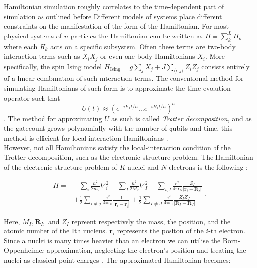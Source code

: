 Hamiltonian simulation roughly correlates to the time-dependent part of simulation as outlined before 
Different models of systems place different constraints on the manifestation of the form of the Hamiltonian. For most physical systems of $n$ particles the Hamiltonian can be written as
$H = \sum_k^L H_k$ where each $H_k$ acts on a specific subsystem. Often these terms are two-body interaction terms such as $X_i X_j$ or even one-body Hamiltonians $X_i$. More specifically, the spin Ising model $
H_{\mathrm{Ising}}=g \sum_{j} X_{j}+J \sum_{\langle i, j\rangle} Z_{i} Z_j
$ consists entirely of a linear combination of such interaction terms. The conventional method for simulating Hamiltonians of such form is to approximate the time-evolution operator such that  $$U(t) \approx\left(e^{-i H_{1} t / n} \ldots e^{-i H_{\ell} t / n}\right)^{n}$$. The method for approximating $U$ as such is called \textit{Trotter decomposition}, and as the gatecount grows polynomially with the number of qubits and time, this method is efficient for
local-interaction Hamiltonians \cite{cao}. \\

However, not all Hamiltonians satisfy the local-interaction condition of the Trotter decomposition, such as the electronic structure problem. The Hamiltonian of the electronic structure problem of $K$ nuclei and $N$ electrons is the following \cite{McArdle}:

$$
\begin{aligned}
H=&-\sum_{i} \frac{\hbar^{2}}{2 m_{e}} \nabla_{i}^{2}-\sum_{I} \frac{\hbar^{2}}{2 M_{I}} \nabla_{I}^{2}-\sum_{i, I} \frac{e^{2}}{4 \pi \epsilon_{0}} \frac{Z_{I}}{\left|\mathbf{r}_{i}-\mathbf{R}_{I}\right|} \\
&+\frac{1}{2} \sum_{i \neq j} \frac{e^{2}}{4 \pi \epsilon_{0}} \frac{1}{\left|\mathbf{r}_{i}-\mathbf{r}_{j}\right|}+\frac{1}{2} \sum_{I \neq J} \frac{e^{2}}{4 \pi \epsilon_{0}} \frac{Z_{I} Z_{J}}{\left|\mathbf{R}_{I}-\mathbf{R}_{J}\right|}
\end{aligned}.
$$

Here, $M_I , \mathbf{R}_{I} ,$  and $Z_I$ repreent respectively the mass, the position, and the atomic number of the Ith nucleus. $\mathbf{r}_{i}$ represents the positon of the $i$-th electron. Since a nuclei is many times heavier than an electron we can utilise the Born-Oppenheimer approximation,  neglecting the electron's position and treating the nuclei as classical point charges \cite{McArdle}. The approximated Hamiltonian becomes:

